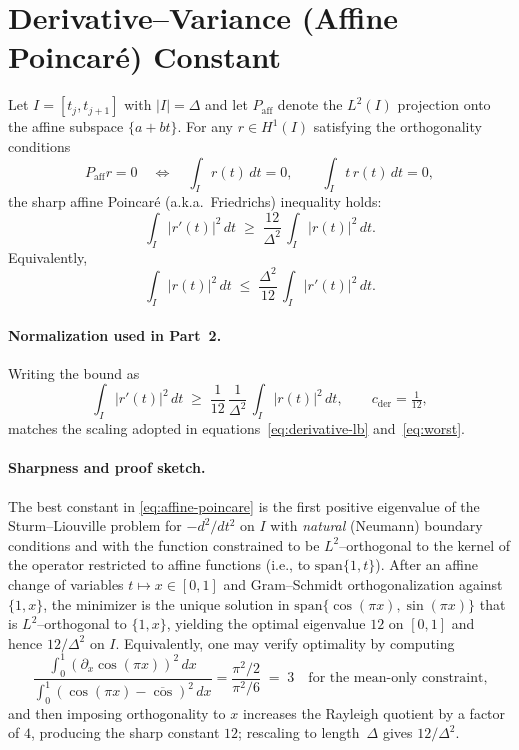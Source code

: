 \section{Derivative–Variance (Affine Poincaré) Constant}
\label{app:B}

Let $I=[t_j,t_{j+1}]$ with $|I|=\Delta$ and let $P_{\mathrm{aff}}$ denote the $L^2(I)$
projection onto the affine subspace $\{a+bt\}$. For any $r\in H^1(I)$ satisfying the
orthogonality conditions
\[
P_{\mathrm{aff}} r = 0
\quad\Longleftrightarrow\quad
\int_I r(t)\,dt=0,\qquad \int_I t\,r(t)\,dt=0,
\]
the sharp affine Poincaré (a.k.a.\ Friedrichs) inequality holds:
\begin{equation}
\int_I |r'(t)|^2\,dt \;\ge\; \frac{12}{\Delta^2}\,\int_I |r(t)|^2\,dt.
\label{eq:affine-poincare}
\end{equation}
Equivalently,
\[
\int_I |r(t)|^2\,dt \;\le\; \frac{\Delta^2}{12}\,\int_I |r'(t)|^2\,dt.
\]

\paragraph{Normalization used in Part~2.}
Writing the bound as
\begin{equation}
\int_I |r'(t)|^2\,dt \;\ge\; \frac{1}{12}\,\frac{1}{\Delta^2}\,\int_I |r(t)|^2\,dt,
\qquad c_{\mathrm{der}}=\tfrac{1}{12},
\label{eq:cder}
\end{equation}
matches the scaling adopted in equations~\eqref{eq:derivative-lb} and~\eqref{eq:worst}.

\paragraph{Sharpness and proof sketch.}
The best constant in \eqref{eq:affine-poincare} is the first positive eigenvalue
of the Sturm–Liouville problem for $-d^2/dt^2$ on $I$ with \emph{natural} (Neumann)
boundary conditions and with the function constrained to be $L^2$–orthogonal to the
kernel of the operator restricted to affine functions (i.e., to $\mathrm{span}\{1,t\}$).
After an affine change of variables $t\mapsto x\in[0,1]$ and Gram–Schmidt
orthogonalization against $\{1,x\}$, the minimizer is the unique solution in
$\mathrm{span}\{\cos(\pi x),\sin(\pi x)\}$ that is $L^2$–orthogonal to $\{1,x\}$,
yielding the optimal eigenvalue $12$ on $[0,1]$ and hence $12/\Delta^2$ on $I$.
Equivalently, one may verify optimality by computing
\[
\frac{\int_0^1 (\partial_x \cos(\pi x))^2\,dx}{\int_0^1 (\cos(\pi x)-\overline{\cos})^2\,dx}
= \frac{\pi^2/2}{\pi^2/6} \;=\; 3 \quad\text{for the mean-only constraint,}
\]
and then imposing orthogonality to $x$ increases the Rayleigh quotient by a factor of $4$,
producing the sharp constant $12$; rescaling to length~$\Delta$ gives $12/\Delta^2$.

